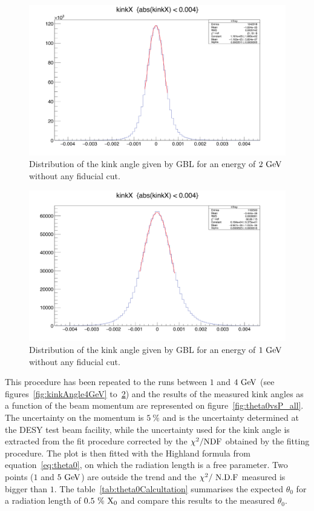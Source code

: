    \begin{figure}[!p]
     \centering
     \includegraphics[width = \textwidth]{Pictures/X0/kinkAngle2GeV.png}
     \caption{Distribution of the kink angle given by GBL for an energy of $2~\rm{GeV}$ without any fiducial cut.}
     \label{fig:kinkAngle2GeV}
   \end{figure} 

   \begin{figure}[!p]
     \centering
     \includegraphics[width = \textwidth]{Pictures/X0/kinkAngle1GeV.png}
     \caption{Distribution of the kink angle given by GBL for an energy of $1~\rm{GeV}$ without any fiducial cut.}
     \label{fig:kinkAngle1GeV}
   \end{figure} 

   This procedure has been repeated to the runs between $1$ and $4~\rm{GeV}$ (see figures~\ref{fig:kinkAngle4GeV} to~\ref{fig:kinkAngle1GeV}) and the results of the measured kink angles as a function of the beam momentum are represented on figure~\ref{fig:theta0vsP_all}. 
   The uncertainty on the momentum is $5~\%$ and is the uncertainty determined at the DESY test beam facility, while the uncertainty used for the kink angle is extracted from the fit procedure corrected by the $\chi^2 / \rm{NDF}$ obtained by the fitting procedure.
   The plot is then fitted with the Highland formula from equation~\ref{eq:theta0}, on which the radiation length is a free parameter.
   Two points ($1$ and $5~\rm{GeV}$) are outside the trend and the $\chi^2 /~\rm{N.D.F}$ measured is bigger than $1$.
   The table~\ref{tab:theta0Calcultation} summarises the expected $\theta_0$ for a radiation length of $0.5~\%~\rm{X_0}$ and compare this results to the measured $\theta_0$.

